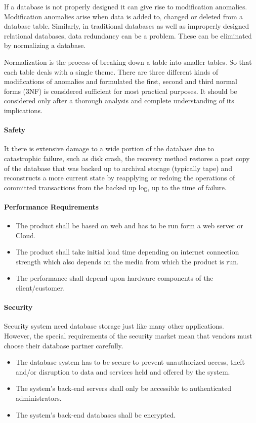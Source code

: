 If a database is not properly designed it can give rise to modification anomalies. Modification anomalies arise when data is added to, changed or deleted from a database table. Similarly, in traditional databases as well as improperly designed relational databases, data redundancy can be a problem. These can be eliminated by normalizing a database.
 
Normalization is the process of breaking down a table into smaller tables. So that each table deals with a single theme. There are three different kinds of modifications of anomalies and formulated the first, second and third normal forms (3NF) is considered sufficient for most practical purposes. It should be considered only after a thorough analysis and complete understanding of its implications.

\paragraph{Safety}
It there is extensive damage to a wide portion of the database due to catastrophic failure, such as disk crash, the recovery method restores a past copy of the database that was backed up to archival storage (typically tape) and reconstructs a more current state by reapplying or redoing the operations of committed transactions from the backed up log, up to the time of failure.

\paragraph{Performance Requirements}
\begin{itemize}
	\item The product shall be based on web and has to be run form a web server or Cloud.
	\item The product shall take initial load time depending on internet connection strength which also depends on the media from which the product is run.
	\item  The performance shall depend upon hardware components of the client/customer.
\end{itemize}

\paragraph{Security}
Security system need database storage just like many other applications. However, the special requirements of the security market mean that vendors must choose their database partner carefully.
\begin{itemize}
	\item The database system has to be secure to prevent unauthorized access, theft and/or disruption to data and services held and offered by the system.
	\item The system's back-end servers shall only be accessible to authenticated administrators.
	\item The system's back-end databases shall be encrypted.
\end{itemize}

